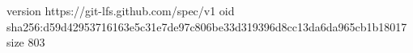 version https://git-lfs.github.com/spec/v1
oid sha256:d59d42953716163e5c31e7de97c806be33d319396d8cc13da6da965cb1b18017
size 803
